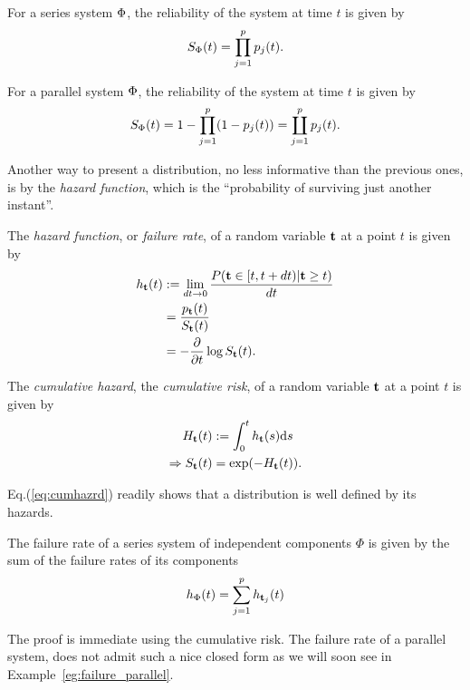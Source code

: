 \begin{example}
For a series system $\Phi$, the reliability of the system at time $t$ is given by $$S_{\Phi} (t)=\prod_{j=1}^{p} p_j(t).$$
\end{example}


\begin{example}
For a parallel system $\Phi$, the reliability of the system at time $t$ is given by $$S_{\Phi} (t)=1- \prod_{j=1}^{p} (1-p_j(t))= \coprod_{j=1}^p p_j(t).$$
\end{example}





Another way to present a distribution, no less informative than the previous ones, is by the \emph{hazard function}, which is the ``probability of surviving just another instant''.
\begin{definition}
The \emph{hazard function}, or \emph{failure rate}, of a random variable $\mathbf{t}$ at a point $t$ is given by 
\begin{align}
	h_{\mathbf{t}} (t) &:= \lim_{dt\to 0}\frac{P( \mathbf{t} \in [t,t+dt)|\mathbf{t} \geq t )}{dt} \label{eq:hazard}\\
	&= \frac{p_{\mathbf{t}} (t)}{S_{\mathbf{t}} (t)} \\
	&= - \frac{\partial}{\partial t}\log S_{\mathbf{t}} (t) . \label{eq:survival_to_hazard}
\end{align}
\end{definition}





\begin{definition}
The \emph{cumulative hazard}, \aka the \emph{cumulative risk}, of a random variable $\mathbf{t}$ at a point $t$ is given by 
\begin{align}
	H_{\mathbf{t}} (t) &:= \int_{0}^{t}h_{\mathbf{t}} (s) \mathrm{d} s \\
	\Rightarrow S_{\mathbf{t}} (t) &= \exp(-H_{\mathbf{t}} (t)). \label{eq:cumhazrd}
\end{align}
\end{definition}
Eq.(\ref{eq:cumhazrd}) readily shows that a distribution is well defined by its hazards.



\begin{theorem}
\label{thm:ifr_closure}
The failure rate of a series system of independent components $\Phi$ is given by the sum of the failure rates of its components
\begin{align}
	h_{\Phi} (t)= \sum_{j=1}^{p} h_{\mathbf{t}_j} (t)
\end{align}
\end{theorem}
The proof is immediate using the cumulative risk.
The failure rate of a parallel system, does not admit such a nice closed form as we will soon see in Example~\ref{eg:failure_parallel}.




